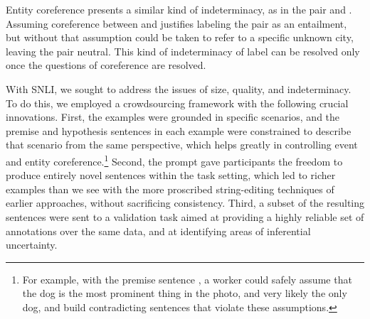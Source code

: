 Entity coreference presents a similar kind of indeterminacy, as in the pair  and . Assuming coreference between  and  justifies labeling the pair as an entailment, but without that assumption  could be taken to refer to a specific unknown city, leaving the pair neutral. This kind of indeterminacy of label can be resolved only once the questions of coreference are resolved.

With SNLI, we sought to address the issues of size, quality, and
indeterminacy. To do this, we employed a crowdsourcing framework with
the following crucial innovations. First, the examples were grounded
in specific scenarios, and the premise and hypothesis sentences in each example 
were constrained to describe that scenario from the same perspective, 
which helps greatly in controlling event and entity coreference.\footnote{
For example, with the premise sentence , a worker could safely assume that the dog is the most prominent thing in the photo, and very likely the only dog, and  build contradicting sentences that violate these assumptions.
} 
Second, the prompt
gave participants the freedom to produce entirely novel sentences
within the task setting, which led to richer examples than we see with
the more proscribed string-editing techniques of earlier approaches,
without sacrificing consistency. Third, a subset of the resulting
sentences were sent to a validation task aimed at providing a highly 
reliable set of annotations over the same data, and at identifying areas of inferential uncertainty.



